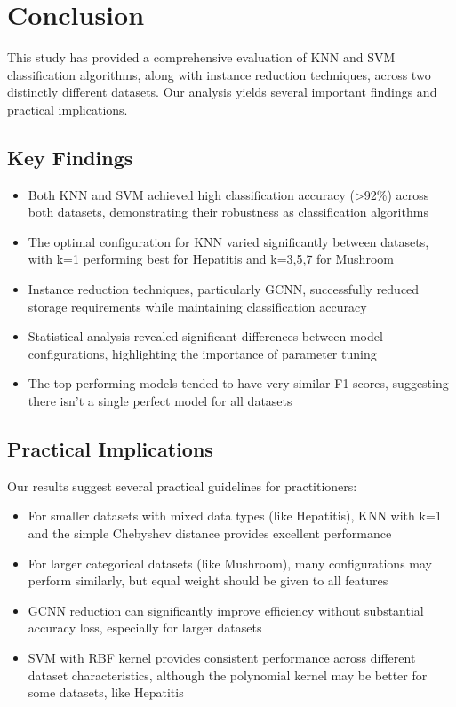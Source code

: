 \section{Conclusion}
\label{sec:conclusion}

This study has provided a comprehensive evaluation of KNN and SVM classification algorithms, along with instance reduction techniques, across two distinctly different datasets. Our analysis yields several important findings and practical implications.

\subsection{Key Findings}

\begin{itemize}
    \item Both KNN and SVM achieved high classification accuracy (\textgreater 92\%) across both datasets, demonstrating their robustness as classification algorithms
    \item The optimal configuration for KNN varied significantly between datasets, with k=1 performing best for Hepatitis and k=3,5,7 for Mushroom
    \item Instance reduction techniques, particularly GCNN, successfully reduced storage requirements while maintaining classification accuracy
    \item Statistical analysis revealed significant differences between model configurations, highlighting the importance of parameter tuning
    \item The top-performing models tended to have very similar F1 scores, suggesting there isn't a single perfect model for all datasets
\end{itemize}

\subsection{Practical Implications}

Our results suggest several practical guidelines for practitioners:
\begin{itemize}
    \item For smaller datasets with mixed data types (like Hepatitis), KNN with k=1 and the simple Chebyshev distance provides excellent performance
    \item For larger categorical datasets (like Mushroom), many configurations may perform similarly, but equal weight should be given to all features
    \item GCNN reduction can significantly improve efficiency without substantial accuracy loss, especially for larger datasets
    \item SVM with RBF kernel provides consistent performance across different dataset characteristics, although the polynomial kernel may be better for some datasets, like Hepatitis
\end{itemize}

